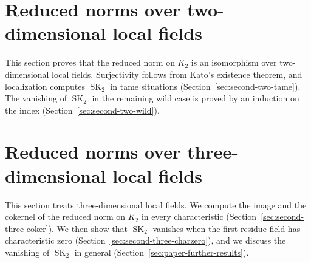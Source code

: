 \documentclass[a4paper,11pt]{article}
\theoremstyle{plain}
\theoremstyle{definition}
\theoremstyle{remark}
\theoremstyle{plain}
\DeclareMathOperator{\SK}{SK}
\begin{document}
\section{Reduced norms over two-dimensional local fields}\label{sec:two-local}
This section proves that the reduced norm on $K_2$ is an isomorphism over two-dimensional local fields.
Surjectivity follows from Kato's existence theorem, and localization computes $\SK_2$ in tame situations (Section~\ref{sec:second-two-tame}).
The vanishing of $\SK_2$ in the remaining wild case is proved by an induction on the index (Section~\ref{sec:second-two-wild}).


\section{Reduced norms over three-dimensional local fields}\label{sec:three-local}
This section treats three-dimensional local fields.
We compute the image and the cokernel of the reduced norm on $K_2$ in every characteristic (Section~\ref{sec:second-three-coker}).
We then show that $\SK_2$ vanishes when the first residue field has characteristic zero (Section~\ref{sec:second-three-charzero}), and we discuss the vanishing of $\SK_2$ in general (Section~\ref{sec:paper-further-results}).





\appendix




\end{document}
